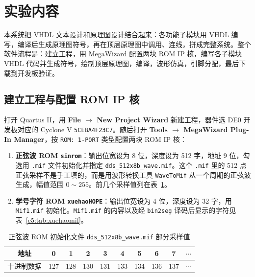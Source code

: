 \documentclass{ctexrep}
\begin{document}
\section{实验内容}

本系统把 VHDL 文本设计和原理图设计结合起来：各功能子模块用 VHDL 编写，编译后生成原理图符号，再在顶层原理图中调用、连线，拼成完整系统。整个软件流程是：建立工程，用 MegaWizard 配置两块 ROM IP 核，编写各子模块 VHDL 代码并生成符号，绘制顶层原理图，编译，波形仿真，引脚分配，最后下载到开发板验证。

\subsection{建立工程与配置 ROM IP 核}

打开 Quartus II，用 \textbf{File $\rightarrow$ New Project Wizard} 新建工程，器件选 DE0 开发板对应的 Cyclone V \texttt{5CEBA4F23C7}。随后打开 \textbf{Tools $\rightarrow$ MegaWizard Plug-In Manager}，按 \texttt{ROM: 1-PORT} 类型配置两块 ROM IP 核：

\begin{enumerate}
    \item \textbf{正弦波 ROM \texttt{sinrom}}：输出位宽设为 8 位，深度设为 512 字，地址 9 位，勾选用 \texttt{.mif} 文件初始化并指定 \texttt{dds\_512x8b\_wave.mif}。这个 \texttt{.mif} 里的 512 点正弦采样不是手工填的，而是用波形转换工具 \texttt{WaveToMif} 从一个周期的正弦波生成，幅值范围 $0\sim255$。前几个采样值列在表~\ref{e5:tab:sinmif}。
    \item \textbf{学号字符 ROM \texttt{xuehaoHOPE}}：输出位宽设为 4 位，深度设为 32 字，用 \texttt{Mif1.mif} 初始化。\texttt{Mif1.mif} 的内容以及经 \texttt{bin2seg} 译码后显示的字符见表~\ref{e5:tab:xuehaomif}。
\end{enumerate}

\begin{table}[H]
    \centering
    \caption{正弦波 ROM 初始化文件 \texttt{dds\_512x8b\_wave.mif} 部分采样值}
    \label{e5:tab:sinmif}
    \begin{tabular}{cccccccccc}
        \toprule
        地址 & 0 & 1 & 2 & 3 & 4 & 5 & 6 & 7 & $\cdots$ \\
        \midrule
        十进制数据 & 127 & 128 & 130 & 131 & 133 & 134 & 136 & 137 & $\cdots$ \\
        \bottomrule
    \end{tabular}
\end{table}
\end{document}
